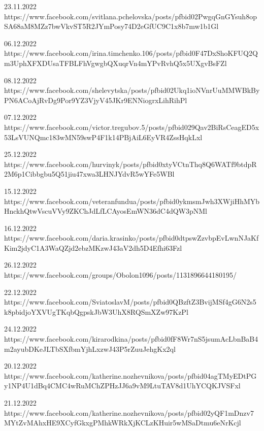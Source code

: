  
 
 
 
 



23.11.2022
https://www.facebook.com/svitlana.pchelovska/posts/pfbid02PwgqGnGYsuh8opSA68aM8MZz7bwVkvST5R2JYmPosy74D2eGfUC9C1x8b7mw1b1Gl

06.12.2022
https://www.facebook.com/irina.timchenko.106/posts/pfbid0F47DxShoKFUQ2Qm3UphXFXDUsaTFBLFhVgwgbQXuqrVn4mYPvRvhQ5x5UXgvBsFZl

08.12.2022
https://www.facebook.com/shelevytska/posts/pfbid02Ukq1ioNVnrUuMMWBkByPN6ACoAjRvDg9Por9YZ3VjyV45JKr9ENNiogrxLihRihPl

07.12.2022
https://www.facebook.com/victor.tregubov.5/posts/pfbid029Qav2BiRsCeagED5x53LsVUNQmc183wMN59swP4F1k14PBjAiL6EyVR4ZssHqkLxl

25.12.2022
https://www.facebook.com/hurvinyk/posts/pfbid0xtyVCtnThq8Q6WATf9btdpR2M6p1Cibbgbu5Q51jiu47xwa3LHNJYdvR5wYFe5WBl

15.12.2022
https://www.facebook.com/veteranfundua/posts/pfbid0ykmsmJwh3XWjiHhMYbHnckhQtwVscuVVy9ZKChJdLfLCAyosEmWN36dC4dQW3pNMl

16.12.2022
https://www.facebook.com/daria.krasinko/posts/pfbid0dtpswZzvbpEvLwnNJaKfKim2jdyC1A3WaQZjd2ebzMKzwJ43aV2dh5D4Efhi63Fzl

26.12.2022
https://www.facebook.com/groups/Obolon1096/posts/1131896644180195/

22.12.2022
https://www.facebook.com/SviatoslavM/posts/pfbid0QBzftZ3BvijMSf4gG6N2s5k8pbidjoYXVUgTKqbQgpskJbW3UhX8RQSmXZw97KzPl

24.12.2022
https://www.facebook.com/kirarodkina/posts/pfbid0fF8Wr7nS5jsumAcLbnBaB4m2ayubDKeJLTbSXfbmYjhLxzwJ43P5rZuuJehgKx2ql

20.12.2022
https://www.facebook.com/katherine.nozhevnikova/posts/pfbid04agTMyEDtPGy1NP4U1dBq4CMC4wRuMChZPHzJJ6a9vM9LtuTAV8d1UhYCQKJVSFxl

21.12.2022
https://www.facebook.com/katherine.nozhevnikova/posts/pfbid02yQF1mDnzv7MYtZvMAhxHE9XCyfGkxgPMhkWRkXjKCLzKHuir5wMSaDtmu6eNrKcjl

